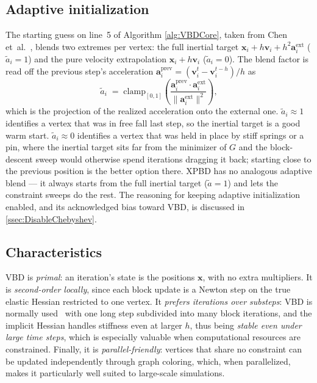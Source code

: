 \subsection{Adaptive initialization}
\label{ssec:VBDAdaptiveInit}
The starting guess on line~5 of Algorithm \autoref{alg:VBDCore}, taken from Chen et~al.~\cite{Chen2024}, blends two extremes per
vertex: the full inertial target $\mathbf{x}_i + h\mathbf{v}_i + h^{2}\mathbf{a}^{\mathrm{ext}}_i$
($\tilde{a}_i = 1$) and the pure velocity extrapolation
$\mathbf{x}_i + h\mathbf{v}_i$ ($\tilde{a}_i = 0$). The blend factor is read off
the previous step's acceleration
$\mathbf{a}^{\mathrm{prev}}_i = (\mathbf{v}_i^{t} - \mathbf{v}_i^{t-h})/h$ as
\begin{equation}
    \label{eq:VBDAdaptive}
    \tilde{a}_i \;=\; \mathrm{clamp}_{[0,1]}\!\left(
        \frac{\mathbf{a}^{\mathrm{prev}}_i \cdot \mathbf{a}^{\mathrm{ext}}_i}
             {\|\mathbf{a}^{\mathrm{ext}}_i\|^{2}}
    \right),
\end{equation}
which is the projection of the realized acceleration onto the external one.
$\tilde{a}_i \approx 1$ identifies a vertex that was in free fall last step,
so the inertial target is a good warm start. $\tilde{a}_i \approx 0$ identifies
a vertex that was held in place by stiff springs or a pin, where the inertial
target sits far from the minimizer of $G$ and the block-descent sweep would
otherwise spend iterations dragging it back; starting close to the previous
position is the better option there. XPBD has no analogous adaptive blend --- it
always starts from the full inertial target ($\tilde{a}=1$) and lets the
constraint sweeps do the rest. The reasoning for keeping adaptive initialization
enabled, and its acknowledged bias toward VBD, is
discussed in \autoref{ssec:DisableChebyshev}.

\subsection{Characteristics}
\label{ssec:VBDChar}
VBD is \emph{primal}: an
iteration's state is the positions $\mathbf{x}$, with no extra multipliers. It is
\emph{second-order locally}, since each block update is a Newton step on the true
elastic Hessian restricted to one vertex. It \emph{prefers iterations over
substeps}: VBD is normally used~\cite{Chen2024} with one long step subdivided into many block
iterations, and the implicit Hessian handles stiffness even at larger $h$, thus
being \emph{stable even under large time steps}, which is especially valuable
when computational resources are constrained. Finally, it is \emph{parallel-friendly}: vertices that share
no constraint can be updated independently through graph coloring, which, when
parallelized, makes it particularly well suited to large-scale simulations.

